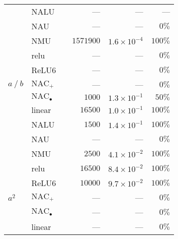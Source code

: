 \begin{table}[H]
\begin{tabular}{lll |rrr}
                       & NALU                       &     & ---                   &      ---              & ---                   \\ 
                       & NAU                        &     & ---                   &     ---               & $0\%$                \\ 
                       & NMU                        &     & $1571900$             & $1.6 \times 10^{-4}$ & $100\%$              \\ 
                       & relu                       &     & ---                   &     ---               & $0\%$                \\ 
                       & ReLU6                      &     & ---                   &     ---               & $0\%$                \\ 
  ${a \mathbin{/} b}$ & ${\mathrm{NAC}_{+}}$      &     & ---                   &     ---               & $0\%$                \\ 
                       & ${\mathrm{NAC}_\bullet}$ &     & $1000$                & $1.3 \times 10^{-1}$ & $50\%$               \\ 
                       & linear                     &     & $16500$               & $1.0 \times 10^{-1}$ & $100\%$              \\ 
                       & NALU                       &     & $1500$                & $1.4 \times 10^{-1}$ & $100\%$              \\ 
                       & NAU                        &     & ---                   &     ---               & $0\%$                \\ 
                       & NMU                        &     & $2500$                & $4.1 \times 10^{-2}$ & $100\%$              \\ 
                       & relu                       &     & $16500$               & $8.4 \times 10^{-2}$ & $100\%$              \\ 
                       & ReLU6                      &     & $10000$               & $9.7 \times 10^{-2}$ & $100\%$              \\ 
  ${a^2}$              & ${\mathrm{NAC}_{+}}$      &     & ---                   &     ---               & $0\%$                \\ 
                       & ${\mathrm{NAC}_\bullet}$ &     & ---                   &     ---               & $0\%$                \\ 
                       & linear                     &     & ---                   &     ---               & $0\%$                \\ 

\end{tabular}
\end{table}
